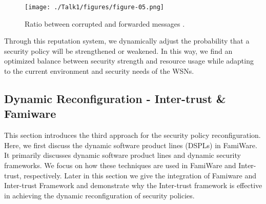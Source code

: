 \documentclass[12pt,a4paper,twoside]{report}
\begin{document}
\begin{figure}[ht]
	\begin{center}
  \texttt{[image: ./Talk1/figures/figure-05.png]}
  \end{center}
  \caption{Ratio between corrupted and forwarded messages \cite{vigo;etal:2014}.}
  \label{fig:05}
\end{figure}

Through this reputation system, we dynamically adjust the probability that a security policy will be strengthened or weakened. In this way, we find an optimized balance between security strength and resource usage while adapting to the current environment and security needs of the WSNs. \par

\subsection{Dynamic Reconfiguration - Inter-trust \& Famiware}
This section introduces the third approach for the security policy reconfiguration. Here, we first discuss the dynamic software product lines (DSPLs) in FamiWare. It primarily discusses dynamic software product lines and dynamic security frameworks. We focus on how these techniques are used in FamiWare and Inter-trust, respectively. Later in this section we give the integration of Famiware and Inter-trust Framework and demonstrate why the Inter-trust framework is effective in achieving the dynamic reconfiguration of security policies. 
\end{document}
